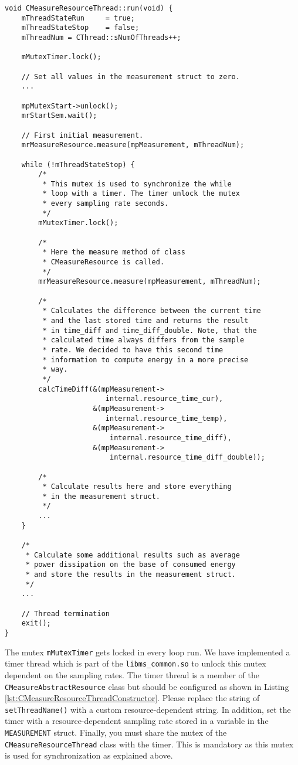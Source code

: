 \begin{description}
\pagebreak
\vspace*{-2.6cm}

\begin{lstlisting}[caption={Scheme of the \texttt{run()} method that each \texttt{CMeasureResourceThread} must have.}, label=lst:RunMethodScheme]
void CMeasureResourceThread::run(void) {
	mThreadStateRun		= true;
	mThreadStateStop	= false;
	mThreadNum = CThread::sNumOfThreads++;
	
	mMutexTimer.lock();
	
	// Set all values in the measurement struct to zero.
	...
	
	mpMutexStart->unlock();
	mrStartSem.wait();
	
	// First initial measurement. 
	mrMeasureResource.measure(mpMeasurement, mThreadNum);
	
	while (!mThreadStateStop) {
		/*
		 * This mutex is used to synchronize the while
		 * loop with a timer. The timer unlock the mutex
		 * every sampling rate seconds.
		 */
		mMutexTimer.lock();
		
		/*
		 * Here the measure method of class
		 * CMeasureResource is called.
		 */
		mrMeasureResource.measure(mpMeasurement, mThreadNum);
		
		/*
		 * Calculates the difference between the current time
		 * and the last stored time and returns the result
		 * in time_diff and time_diff_double. Note, that the
		 * calculated time always differs from the sample
		 * rate. We decided to have this second time
		 * information to compute energy in a more precise
		 * way.
		 */
		calcTimeDiff(&(mpMeasurement->
				       	internal.resource_time_cur),
					 &(mpMeasurement->
					 	internal.resource_time_temp),
					 &(mpMeasurement->
						 internal.resource_time_diff),
					 &(mpMeasurement->
						 internal.resource_time_diff_double));
			
		/* 
		 * Calculate results here and store everything
		 * in the measurement struct.
		 */
		...
	}
	
	/* 
	 * Calculate some additional results such as average
	 * power dissipation on the base of consumed energy
	 * and store the results in the measurement struct.
	 */
	...
	
	// Thread termination
	exit();
}	
\end{lstlisting}
	The mutex \texttt{mMutexTimer} gets locked in every loop run. We have implemented a timer thread which is part of the \texttt{libms\_common.so} to unlock this mutex dependent on the sampling rates. The timer thread is a member of the \texttt{CMeasureAbstractResource} class but should be configured as shown in Listing \ref{lst:CMeasureResourceThreadConstructor}. Please replace the string of \texttt{setThreadName()} with a custom resource-dependent string. In addition, set the timer with a resource-dependent sampling rate stored in a variable in the \texttt{MEASUREMENT} struct. Finally, you must share the mutex of the \texttt{CMeasureResourceThread} class with the timer. This is mandatory as this mutex is used for synchronization as explained above.


\end{description}
